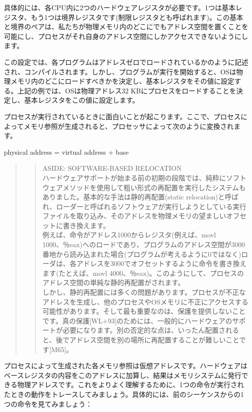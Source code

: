 具体的には、各CPU内に2つのハードウェアレジスタが必要です。1つは基本レジスタ、もう1つは境界レジスタです(制限レジスタとも呼ばれます)。この基本と境界のペアは、私たちが物理メモリ内のどこにでもアドレス空間を置くことを可能にし、プロセスがそれ自身のアドレス空間にしかアクセスできないようにします。

この設定では、各プログラムはアドレスゼロでロードされているかのように記述され、コンパイルされます。しかし、プログラムが実行を開始すると、OSは物理メモリ内のどこにロードすべきかを決定し、基本レジスタをその値に設定する。上記の例では、OSは物理アドレス32
KBにプロセスをロードすることを決定し、基本レジスタをこの値に設定します。

プロセスが実行されているときに面白いことが起こります。ここで、プロセスによってメモリ参照が生成されると、プロセッサによって次のように変換されます。

physical address = virtual address + base

\begin{quote}
\begin{quote}
ASIDE: SOFTWARE-BASED RELOCATION\\
ハードウェアサポートが始まる前の初期の段階では、純粋にソフトウェアメソッドを使用して粗い形式の再配置を実行したシステムもありました。基本的な手法は静的再配置(static
relocation)と呼ばれ、ローダーと呼ばれるソフトウェアが実行しようとしている実行ファイルを取り込み、そのアドレスを物理メモリの望ましいオフセットに書き換えます。\\
例えば、命令がアドレス1000からレジスタ(例えば、movl
1000、％eax)へのロードであり、プログラムのアドレス空間が3000番地から読み込まれた場合(プログラムが考えるように0ではなく)ローダは、各アドレスを3000でオフセットするように命令を書き換えます(たとえば、movl
4000、％eax)。このようにして、プロセスのアドレス空間の単純な静的再配置がされます。\\
しかし、静的再配置には多くの問題があります。プロセスが不正なアドレスを生成し、他のプロセスやOSメモリに不正にアクセスする可能性があります。そして最も重要なのは、保護を提供しないことです。真の保護{[}WL+93{]}のためには、一般的にハードウェアのサポートが必要になります。別の否定的な点は、いったん配置されると、後でアドレス空間を別の場所に再配置することが難しいことです{[}M65{]}。
\end{quote}
\end{quote}

プロセスによって生成された各メモリ参照は仮想アドレスです。ハードウェアはベースレジスタの内容をこのアドレスに加算し、結果はメモリシステムに発行できる物理アドレスです。これをよりよく理解するために、1つの命令が実行されたときの動作をトレースしてみましょう。具体的には、前のシーケンスからの1つの命令を見てみましょう：

